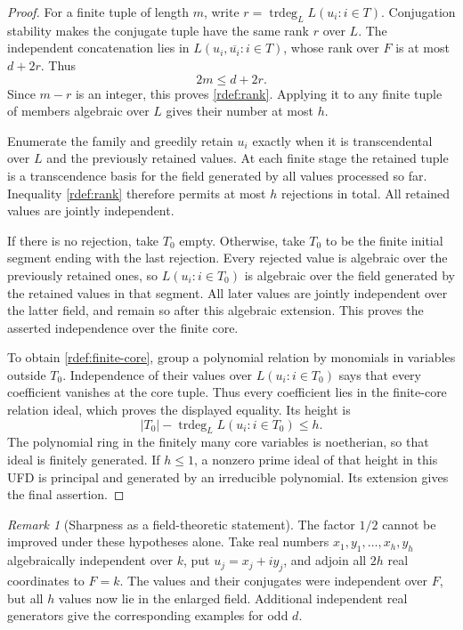 \documentclass[11pt]{article}
\theoremstyle{definition}
\theoremstyle{remark}
\newtheorem{remark}[theorem]{Remark}
\begin{document}
\begin{proof}
For a finite tuple of length $m$, write
$r=\operatorname{trdeg}_L L(u_i:i\in T)$. Conjugation stability
makes the conjugate tuple have the same rank $r$ over $L$. The
independent concatenation lies in $L(u_i,\overline{u_i}:i\in T)$,
whose rank over $F$ is at most $d+2r$. Thus
\[
                              2m\le d+2r.
\]
Since $m-r$ is an integer, this proves \eqref{rdef:rank}. Applying
it to any finite tuple of members algebraic over $L$ gives their
number at most $h$.

Enumerate the family and greedily retain $u_i$ exactly when it is
transcendental over $L$ and the previously retained values. At each
finite stage the retained tuple is a transcendence basis for the field
generated by all values processed so far. Inequality
\eqref{rdef:rank} therefore permits at most $h$ rejections in total.
All retained values are jointly independent.

If there is no rejection, take $T_0$ empty. Otherwise, take $T_0$
to be the finite initial segment ending with the last rejection.
Every rejected value is algebraic over the previously retained ones,
so $L(u_i:i\in T_0)$ is algebraic over the field generated by the
retained values in that segment. All later values are jointly
independent over the latter field, and remain so after this algebraic
extension. This proves the asserted independence over the finite core.

To obtain \eqref{rdef:finite-core}, group a polynomial relation by
monomials in variables outside $T_0$. Independence of their values over
$L(u_i:i\in T_0)$ says that every coefficient vanishes at the core
tuple. Thus every coefficient lies in the finite-core relation ideal,
which proves the displayed equality. Its height is
\[
 |T_0|-\operatorname{trdeg}_L L(u_i:i\in T_0)\le h.
\]
The polynomial ring in the finitely many core variables is noetherian,
so that ideal is finitely generated. If $h\le1$, a nonzero prime
ideal of that height in this UFD is principal and generated by an
irreducible polynomial. Its extension gives the final assertion.
\end{proof}

\begin{remark}[Sharpness as a field-theoretic statement]
The factor $1/2$ cannot be improved under these hypotheses alone.
Take real numbers $x_1,y_1,\ldots,x_h,y_h$ algebraically independent
over $k$, put $u_j=x_j+iy_j$, and adjoin all $2h$ real coordinates
to $F=k$. The values and their conjugates were independent over $F$,
but all $h$ values now lie in the enlarged field. Additional independent
real generators give the corresponding examples for odd $d$.
\end{remark}
\end{document}
